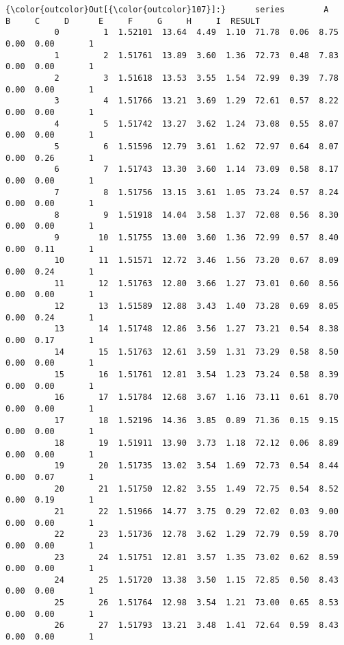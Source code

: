 \documentclass[11pt]{article}
\begin{document}
\begin{Verbatim}[commandchars=\\\{\}]
{\color{outcolor}Out[{\color{outcolor}107}]:}      series        A      B     C     D      E     F     G     H     I  RESULT
          0         1  1.52101  13.64  4.49  1.10  71.78  0.06  8.75  0.00  0.00       1
          1         2  1.51761  13.89  3.60  1.36  72.73  0.48  7.83  0.00  0.00       1
          2         3  1.51618  13.53  3.55  1.54  72.99  0.39  7.78  0.00  0.00       1
          3         4  1.51766  13.21  3.69  1.29  72.61  0.57  8.22  0.00  0.00       1
          4         5  1.51742  13.27  3.62  1.24  73.08  0.55  8.07  0.00  0.00       1
          5         6  1.51596  12.79  3.61  1.62  72.97  0.64  8.07  0.00  0.26       1
          6         7  1.51743  13.30  3.60  1.14  73.09  0.58  8.17  0.00  0.00       1
          7         8  1.51756  13.15  3.61  1.05  73.24  0.57  8.24  0.00  0.00       1
          8         9  1.51918  14.04  3.58  1.37  72.08  0.56  8.30  0.00  0.00       1
          9        10  1.51755  13.00  3.60  1.36  72.99  0.57  8.40  0.00  0.11       1
          10       11  1.51571  12.72  3.46  1.56  73.20  0.67  8.09  0.00  0.24       1
          11       12  1.51763  12.80  3.66  1.27  73.01  0.60  8.56  0.00  0.00       1
          12       13  1.51589  12.88  3.43  1.40  73.28  0.69  8.05  0.00  0.24       1
          13       14  1.51748  12.86  3.56  1.27  73.21  0.54  8.38  0.00  0.17       1
          14       15  1.51763  12.61  3.59  1.31  73.29  0.58  8.50  0.00  0.00       1
          15       16  1.51761  12.81  3.54  1.23  73.24  0.58  8.39  0.00  0.00       1
          16       17  1.51784  12.68  3.67  1.16  73.11  0.61  8.70  0.00  0.00       1
          17       18  1.52196  14.36  3.85  0.89  71.36  0.15  9.15  0.00  0.00       1
          18       19  1.51911  13.90  3.73  1.18  72.12  0.06  8.89  0.00  0.00       1
          19       20  1.51735  13.02  3.54  1.69  72.73  0.54  8.44  0.00  0.07       1
          20       21  1.51750  12.82  3.55  1.49  72.75  0.54  8.52  0.00  0.19       1
          21       22  1.51966  14.77  3.75  0.29  72.02  0.03  9.00  0.00  0.00       1
          22       23  1.51736  12.78  3.62  1.29  72.79  0.59  8.70  0.00  0.00       1
          23       24  1.51751  12.81  3.57  1.35  73.02  0.62  8.59  0.00  0.00       1
          24       25  1.51720  13.38  3.50  1.15  72.85  0.50  8.43  0.00  0.00       1
          25       26  1.51764  12.98  3.54  1.21  73.00  0.65  8.53  0.00  0.00       1
          26       27  1.51793  13.21  3.48  1.41  72.64  0.59  8.43  0.00  0.00       1

\end{Verbatim}
\end{document}
